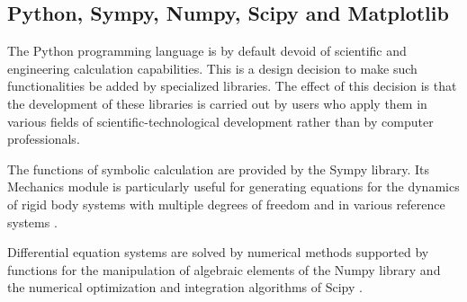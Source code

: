 





\subsection{Python, Sympy, Numpy, Scipy and Matplotlib}
The Python programming language is by default devoid of scientific and engineering calculation capabilities.
This is a design decision to make such functionalities be added by specialized libraries.
The effect of this decision is that the development of these libraries is carried out by users who apply them in various fields of scientific-technological development rather than by computer professionals.

The functions of symbolic calculation are provided by the Sympy library. Its Mechanics module is particularly useful for generating equations for the dynamics of rigid body systems with multiple degrees of freedom and in various reference systems \cite{sympy}.

Differential equation systems are solved by numerical methods supported by functions for the manipulation of algebraic elements of the Numpy library \cite{numpy} and the numerical optimization and integration algorithms of Scipy \cite{SciPy}.

